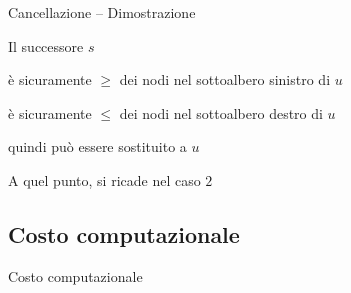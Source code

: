 \begin{frame}{Cancellazione -- Dimostrazione}

\vspace{-9pt}
\begin{myboxtitle}
\BI
\item Il successore $s$ 
\BI
\item è sicuramente $\geq$ dei nodi nel sottoalbero sinistro di $u$
\item è sicuramente $\leq$ dei nodi nel sottoalbero destro di $u$
\EI
\item quindi può essere sostituito a $u$
\item A quel punto, si ricade nel caso $2$
\EI
\end{myboxtitle}

\end{frame}


\subsection{Costo computazionale}

\begin{frame}{Costo computazionale}

\vspace{-12pt}

\end{frame}

